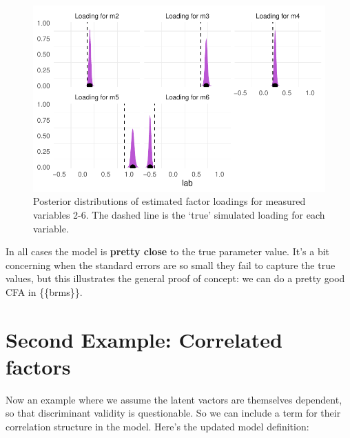 \documentclass[
  letterpaper,
  DIV=11,
  numbers=noendperiod]{scrreprt}
\begin{document}
\begin{figure}[H]

{\centering \includegraphics{./bayesian-cfa_files/figure-pdf/viz-draws-1-fac-1.pdf}

}

\caption{Posterior distributions of estimated factor loadings for
measured variables 2-6. The dashed line is the `true' simulated loading
for each variable.}

\end{figure}

In all cases the model is \textbf{pretty close} to the true parameter
value. It's a bit concerning when the standard errors are so small they
fail to capture the true values, but this illustrates the general proof
of concept: we can do a pretty good CFA in \{\{brms\}\}.

\hypertarget{second-example-correlated-factors}{%
\section{Second Example: Correlated
factors}\label{second-example-correlated-factors}}

Now an example where we assume the latent vactors are themselves
dependent, so that discriminant validity is questionable. So we can
include a term for their correlation structure in the model. Here's the
updated model definition:
\end{document}
